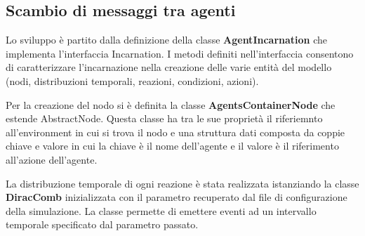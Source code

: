 \documentclass[12pt,a4paper,openright,twoside]{report}
\begin{document}
\subsection{Scambio di messaggi tra agenti}
Lo sviluppo \`e partito dalla definizione della classe \textbf{AgentIncarnation} che implementa l'interfaccia Incarnation. I metodi definiti nell'interfaccia consentono di caratterizzare l'incarnazione nella creazione delle varie entit\`a del modello (nodi, distribuzioni temporali, reazioni, condizioni, azioni).

Per la creazione del nodo si \`e definita la classe \textbf{AgentsContainerNode} che estende AbstractNode. Questa classe ha tra le sue propriet\`a il riferiemnto all'environment in cui si trova il nodo e una struttura dati composta da coppie chiave e valore in cui la chiave \`e il nome dell'agente e il valore \`e il riferimento all'azione dell'agente.

La distribuzione temporale di ogni reazione \`e stata realizzata istanziando la classe \textbf{DiracComb} inizializzata con il parametro recuperato dal file di configurazione della simulazione. La classe permette di emettere eventi ad un intervallo temporale specificato dal parametro passato.
\end{document}
